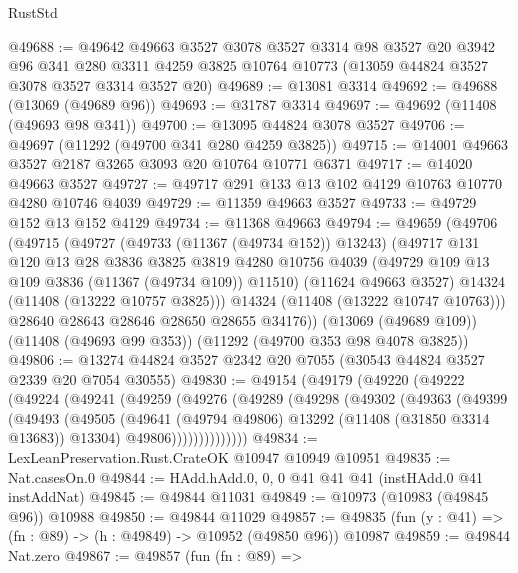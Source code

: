 \begin{lexlean}{RustStd}
\begin{coremodule}
@49688 := @49642
    @49663
    @3527
    @3078
    @3527
    @3314
    @98
    @3527
    @20
    @3942
    @96
    @341
    @280
    @3311
    @4259
    @3825
    @10764
    @10773
    (@13059 @44824 @3527 @3078 @3527 @3314 @3527 @20)
@49689 := @13081 @3314
@49692 := @49688 (@13069 (@49689 @96))
@49693 := @31787 @3314
@49697 := @49692 (@11408 (@49693 @98 @341))
@49700 := @13095 @44824 @3078 @3527
@49706 := @49697 (@11292 (@49700 @341 @280 @4259 @3825))
@49715 := @14001 @49663 @3527 @2187 @3265 @3093 @20 @10764 @10771 @6371
@49717 := @14020 @49663 @3527
@49727 := @49717 @291 @133 @13 @102 @4129 @10763 @10770 @4280 @10746 @4039
@49729 := @11359 @49663 @3527
@49733 := @49729 @152 @13 @152 @4129
@49734 := @11368 @49663
@49794 := @49659
    (@49706
      (@49715
        (@49727
          (@49733 (@11367 (@49734 @152)) @13243)
          (@49717
            @131
            @120
            @13
            @28
            @3836
            @3825
            @3819
            @4280
            @10756
            @4039
            (@49729 @109 @13 @109 @3836 (@11367 (@49734 @109)) @11510)
            (@11624 @49663 @3527)
            @14324
            (@11408 (@13222 @10757 @3825)))
          @14324
          (@11408 (@13222 @10747 @10763)))
        @28640
        @28643
        @28646
        @28650
        @28655
        @34176))
    (@13069 (@49689 @109))
    (@11408 (@49693 @99 @353))
    (@11292 (@49700 @353 @98 @4078 @3825))
@49806 := @13274 @44824 @3527 @2342 @20 @7055 (@30543 @44824 @3527 @2339 @20 @7054 @30555)
@49830 := @49154
    (@49179
      (@49220
        (@49222
          (@49224
            (@49241
              (@49259
                (@49276
                  (@49289
                    (@49298
                      (@49302
                        (@49363
                          (@49399
                            (@49493
                              (@49505
                                (@49641
                                  (@49794 @49806)
                                  @13292
                                  (@11408 (@31850 @3314 @13683))
                                  @13304)
                                @49806))))))))))))))
@49834 := LexLeanPreservation.Rust.CrateOK @10947 @10949 @10951
@49835 := Nat.casesOn.{0}
@49844 := HAdd.hAdd.{0, 0, 0} @41 @41 @41 (instHAdd.{0} @41 instAddNat)
@49845 := @49844 @11031
@49849 := @10973 (@10983 (@49845 @96)) @10988
@49850 := @49844 @11029
@49857 := @49835 (fun (y : @41) => (fn : @89) -> (h : @49849) -> @10952 (@49850 @96)) @10987
@49859 := @49844 Nat.zero
@49867 := @49857
    (fun (fn : @89) =>

\end{coremodule}
\end{lexlean}
